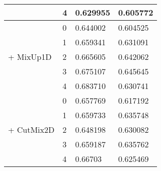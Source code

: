 \begin{table}[h!]
\begin{tabular}{|l|l|l|l|}
                           & 4    & 0.629955  & 0.605772   \\ \hline
\multirow{5}{*}{+ MixUp1D} & 0    & 0.644002  & 0.604525   \\ \cline{2-4} 
                           & 1    & 0.659341  & 0.631091   \\ \cline{2-4} 
                           & 2    & 0.665605  & 0.642062   \\ \cline{2-4} 
                           & 3    & 0.675107  & 0.645645   \\ \cline{2-4} 
                           & 4    & 0.683710  & 0.630741   \\ \hline
\multirow{5}{*}{+ CutMix2D}      & 0    & 0.657769  & 0.617192   \\ \cline{2-4} 
                           & 1    & 0.659733  & 0.635748   \\ \cline{2-4} 
                           & 2    & 0.648198  & 0.630082   \\ \cline{2-4} 
                           & 3    & 0.659187  & 0.635762   \\ \cline{2-4} 
                           & 4    & 0.66703   & 0.625469   \\ \hline

\end{tabular}
\label{tab:ablation-experiment-result}
\end{table}
